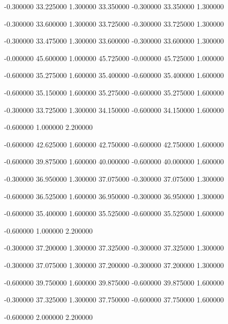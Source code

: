  {-0.300000} {33.225000} {1.300000} {33.350000} {-0.300000} {33.350000} {1.300000}

 {-0.300000} {33.600000} {1.300000} {33.725000} {-0.300000} {33.725000} {1.300000}

 {-0.300000} {33.475000} {1.300000} {33.600000} {-0.300000} {33.600000} {1.300000}

 {-0.000000} {45.600000} {1.000000} {45.725000} {-0.000000} {45.725000} {1.000000}

 {-0.600000} {35.275000} {1.600000} {35.400000} {-0.600000} {35.400000} {1.600000}

 {-0.600000} {35.150000} {1.600000} {35.275000} {-0.600000} {35.275000} {1.600000}

 {-0.300000} {33.725000} {1.300000} {34.150000} {-0.600000} {34.150000} {1.600000}

 {-0.600000} {1.000000} {2.200000}

 {-0.600000} {42.625000} {1.600000} {42.750000} {-0.600000} {42.750000} {1.600000}

 {-0.600000} {39.875000} {1.600000} {40.000000} {-0.600000} {40.000000} {1.600000}

 {-0.300000} {36.950000} {1.300000} {37.075000} {-0.300000} {37.075000} {1.300000}

 {-0.600000} {36.525000} {1.600000} {36.950000} {-0.300000} {36.950000} {1.300000}

 {-0.600000} {35.400000} {1.600000} {35.525000} {-0.600000} {35.525000} {1.600000}

 {-0.600000} {1.000000} {2.200000}

 {-0.300000} {37.200000} {1.300000} {37.325000} {-0.300000} {37.325000} {1.300000}

 {-0.300000} {37.075000} {1.300000} {37.200000} {-0.300000} {37.200000} {1.300000}

 {-0.600000} {39.750000} {1.600000} {39.875000} {-0.600000} {39.875000} {1.600000}

 {-0.300000} {37.325000} {1.300000} {37.750000} {-0.600000} {37.750000} {1.600000}

 {-0.600000} {2.000000} {2.200000}

